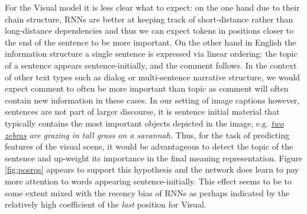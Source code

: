 For the {\sc Visual} model it is less clear what to
expect: on the one hand due to their chain structure,  
RNNs are better at keeping track of
short-distance rather than long-distance dependencies and thus we can expect 
tokens in positions closer to the end of the sentence to be more important. 
On the other hand in English the information structure a single
sentence is 
expressed via linear ordering: the {\sc topic} of a 
sentence appears sentence-initially, and the {\sc comment} follows. 
In the context of other text types such as dialog or multi-sentence \label{edit:topiccomment}
narrative structure, we would expect {\sc comment} to often be more
important than {\sc topic} as {\sc comment} will often 
contain new information in these cases. In our setting of image captions 
however, sentences are not part of larger discourse, it is sentence
initial material that typically contains the most important 
objects depicted in the image, e.g. {\it {\underline{two zebras}} are grazing in tall grass on a savannah.}
Thus, for the task of predicting features of the visual scene, it would 
be advantageous to detect the topic of the sentence and up-weight its
importance in the final meaning representation. Figure \ref{fig:posrqs}
appears to support this hypothesis and the network does 
learn to pay more attention to  words appearing
sentence-initially. This effect seems to be to some extent mixed with the recency
bias of RNNs as perhaps indicated by the relatively high coefficient of the {\it last}
position for {\sc Visual}. 





